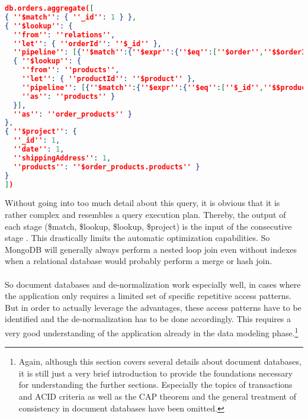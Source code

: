 \begin{lstlisting}[language=JSON, caption=JSON Document, captionpos=b, label=lst:JSONDocument]
db.orders.aggregate([
{ ''$match'': { ''_id'': 1 } },
{ ''$lookup'': {
  ''from'': ''relations'',
  ''let'': { ''orderId'': ''$_id'' },
  ''pipeline'': [{''$match'':{''$expr'':{''$eq'':[''$order'',''$$orderId'']}}},
  { ''$lookup'': {
    ''from'': ''products'',
    ''let'': { ''productId'': ''$product'' },
    ''pipeline'': [{''$match'':{''$expr'':{''$eq'':[''$_id'',''$$productId'']}}}],
    ''as'': ''products'' }
  }],
  ''as'': ''order_products'' }
},
{ ''$project'': {
  ''_id'': 1,
  ''date'': 1,
  ''shippingAddress'': 1,
  ''products'': ''$order_products.products'' }
}
])
\end{lstlisting}

Without going into too much detail about this query, it is obvious that it is rather complex and resembles a query execution plan. Thereby, the output of each stage (\$match, \$lookup, \$lookup, \$project) is the input of the consecutive stage \cite{MongoDBAggrPipeline}. This drastically limits the automatic optimization capabilities. So MongoDB will generally always perform a nested loop join even without indexes when a relational database would probably perform a merge or hash join.\\\\ 
So document databases and de-normalization work especially well, in cases where the application only requires a limited set of specific repetitive access patterns. But in order to actually leverage the advantages, these access patterns have to be identified and the de-normalization has to be done accordingly. This requires a very good understanding of the application already in the data modeling phase.\footnote{Again, although this section covers several details about document databases, it is still just a very brief introduction to provide the foundations necessary for understanding the further sections. Especially the topics of transactions and ACID criteria as well as the CAP theorem and the general treatment of consistency in document databases have been omitted.} 

